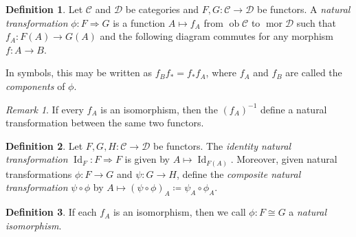 \documentclass[10pt,letterpaper,cm]{nupset}
\theoremstyle{definition}
\newtheorem{definition}{Definition}
\theoremstyle{theorem}
\theoremstyle{remark}
\newtheorem{remark}{Remark}
\newcommand{\1}{\mathbf{1}}
\renewcommand{\c}{\mathscr{C}}
\renewcommand{\d}{\mathscr{D}}
\newcommand{\0}{\vec 0}
\DeclareMathOperator{\id}{Id}
\DeclareMathOperator{\ob}{ob}
\DeclareMathOperator{\mor}{mor}
\begin{document}
\begin{abstract}
More basic category theory. The main sources for this talk are the following.
\begin{itemize}
\item $n$Lab.
\item John Rognes's \textit{Lecture Notes on Algebraic $K$-Theory}, Ch. 3.
\item Peter Johnstone's lecture notes for ``Category Theory" (Mathematical Tripos Part III, Michaelmas 2015), Ch. 1.
\end{itemize}
\end{abstract}

\begin{definition}
Let $\c$ and $\d$ be categories and $F,G: \c \to \d$ be functors.  A \textit{natural transformation} $\phi :F \Rightarrow G$  is a function $A \mapsto f_A$ from $\ob \c$ to $\mor \d$ such that $f_A : F(A) \to G(A)$ and the following diagram commutes for any morphism $f: A \to B$.

\begin{center}
\end{center}
In symbols, this may be written as $f_Bf_{\ast} = f_{\ast}f_A$, where $f_A$ and $f_B$ are called the \textit{components} of $\phi$.
\end{definition}

\begin{remark}\label{rmk}
If every $f_A$ is an isomorphism, then the $(f_A)^{{-}1}$ define a natural transformation between the same two functors.
\end{remark}

\begin{definition}
Let $F, G, H: \c \to \d$ be functors. The \textit{identity natural transformation} $\id_F : F \Rightarrow F$ is given by $A \mapsto \id_{F(A)}$. Moreover, given natural transformations $\phi: F \to G$ and $\psi: G \to H$, define the \textit{composite natural transformation} $\psi \circ \phi$ by $A \mapsto (\psi \circ \phi)_A \coloneqq \psi_{A} \circ \phi_{A}$.
\end{definition}


\begin{definition}
If each $f_A$ is an isomorphism, then we call $\phi: F \cong G$ a \textit{natural isomorphism}.
\end{definition}
\end{document}
